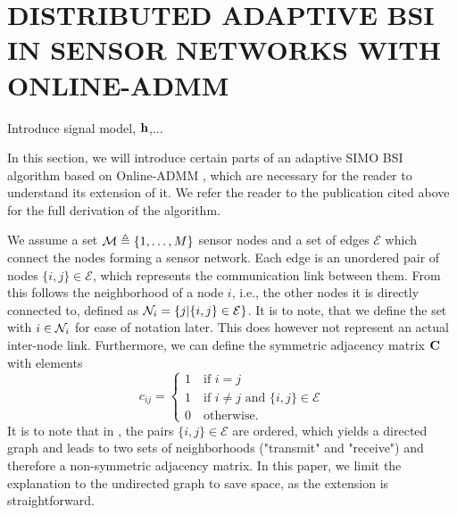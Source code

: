 \documentclass{article}
\begin{document}
\section{DISTRIBUTED ADAPTIVE BSI IN SENSOR NETWORKS WITH ONLINE-ADMM}
\label{sec:dbsi}
\begin{todo}
    Introduce signal model, \(\bm{\mathrm{h}}\),...
\end{todo}
In this section, we will introduce certain parts of an adaptive SIMO BSI algorithm based on Online-ADMM \cite{blochbergerDBSI}, which are necessary for the reader to understand its extension of it.
We refer the reader to the publication cited above for the full derivation of the algorithm.

We assume a set \(\mathcal{M} \triangleq \{1,\ldots,M\}\) sensor nodes and a set of edges \(\mathcal{E}\) which connect the nodes forming a sensor network.
Each edge is an unordered pair of nodes \(\{i,j\} \in \mathcal{E}\), which represents the communication link between them.
From this follows the neighborhood of a node \(i\), i.e., the other nodes it is directly connected to, defined as \(\mathcal{N}_i = \{j|\{i,j\} \in \mathcal{E}\}\).
It is to note, that we define the set with \(i \in \mathcal{N}_i\) for ease of notation later.
This does however not represent an actual inter-node link.
Furthermore, we can define the symmetric adjacency matrix \(\bm{\mathrm{C}}\) with elements
\begin{equation}
    c_{ij} = \begin{cases}
        1 \quad \text{if } i = j\\
        1 \quad \text{if } i \neq j \text{ and }\{i,j\} \in \mathcal{E}\\
        0 \quad \text{otherwise}.
    \end{cases}
\end{equation}
It is to note that in \cite{blochbergerDBSI}, the pairs \(\{i,j\} \in \mathcal{E}\) are ordered, which yields a directed graph and leads to two sets of neighborhoods ("transmit" and "receive") and therefore a non-symmetric adjacency matrix.
In this paper, we limit the explanation to the undirected graph to save space, as the extension is straightforward.
\end{document}
